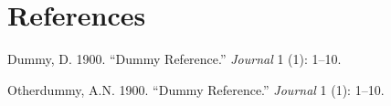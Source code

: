\documentclass[
]{article}
\newlength{\cslhangindent}
\newlength{\cslentryspacingunit} %
\newenvironment{CSLReferences}[2] %
 {%
  \setlength{\parindent}{0pt}
  \ifodd #1
  \let\oldpar\par
  \def\par{\hangindent=\cslhangindent\oldpar}
  \fi
  \setlength{\parskip}{#2\cslentryspacingunit}
 }%
 {}
\theoremstyle{plain}
\theoremstyle{plain}
\theoremstyle{plain}
\theoremstyle{plain}
\theoremstyle{plain}
\theoremstyle{plain}
\theoremstyle{plain}
\theoremstyle{plain}
\theoremstyle{plain}
\begin{document}
\hypertarget{references}{%
\section*{References}\label{references}}

\hypertarget{refs}{}
\begin{CSLReferences}{1}{0}
\leavevmode{}%
Dummy, D. 1900. {``Dummy Reference.''} \emph{Journal} 1 (1): 1--10.

\leavevmode{}%
Otherdummy, A.N. 1900. {``Dummy Reference.''} \emph{Journal} 1 (1):
1--10.

\end{CSLReferences}
\end{document}

